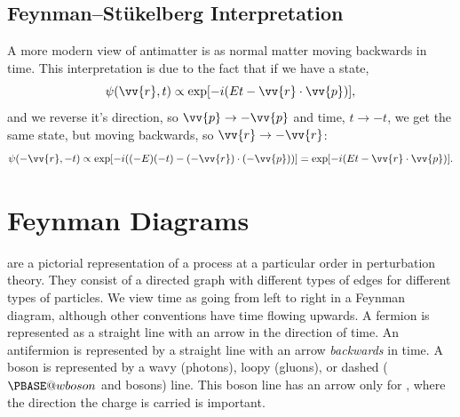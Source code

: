 \documentclass[fleqn]{NotesClass}
\makeatletter
\newcommand{\Pwboson}{\ensuremath{\PBASE@wboson}}
\newcommand{\PW}{\Pwboson}
\makeatother
\begin{document}
    \subsection{Feynman--St\"ukelberg Interpretation}
    A more modern view of antimatter is as normal matter moving backwards in time.
    This interpretation is due to the fact that if we have a state,
    \begin{equation}
        \psi(\vv{r}, t) \propto \exp[-i(Et - \vv{r} \cdot \vv{p})],
    \end{equation}
    and we reverse it's direction, so \(\vv{p} \to -\vv{p}\) and time, \(t \to -t\), we get the same state, but moving backwards, so \(\vv{r} \to -\vv{r}\):
    \begin{equation}
        \psi(-\vv{r}, -t) \propto \exp[-i((-E)(-t) - (-\vv{r})\cdot(-\vv{p}))] = \exp[-i(Et - \vv{r}\cdot\vv{p})].
    \end{equation}
    
    \section{Feynman Diagrams}
     are a pictorial representation of a process at a particular order in perturbation theory.
    They consist of a directed graph with different types of edges for different types of particles.
    We view time as going from left to right in a Feynman diagram, although other conventions have time flowing upwards.
    A fermion is represented as a straight line with an arrow in the direction of time.
    An antifermion is represented by a straight line with an arrow \emph{backwards} in time.
    A boson is represented by a wavy (photons), loopy (gluons), or dashed (\PW{} and \PZ{} bosons) line.
    This boson line has an arrow only for \PWpm, where the direction the charge is carried is important.
    
\end{document}
